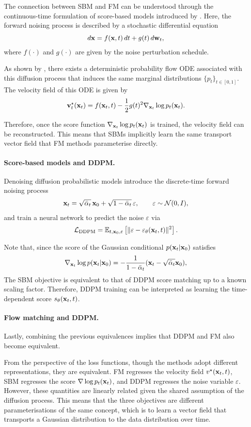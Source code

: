 The connection between SBM and FM can be understood through the continuous-time formulation of score-based models introduced by \cite{song2021scorebased}. Here, the forward noising process is described by a stochastic differential equation
\[
d{ \mathbf{x}} = f({ \mathbf{x}},t)\,dt + g(t)\,d{ \mathbf{w}}_t,
\]
where $f(\cdot)$ and $g(\cdot)$ are given by the noise perturbation schedule. 

As shown by \cite{song2021scorebased}, there exists a deterministic probability flow ODE associated with this diffusion process that induces the same marginal distributions $\{p_t\}_{t\in[0,1]}$. The velocity field of this ODE is given by
\[
{ \mathbf{v}}_t^\star({ \mathbf{x}}_t)
=
f({ \mathbf{x}}_t,t)
-
\frac{1}{2} g(t)^2 \nabla_{{ \mathbf{x}}_t}\log p_t({ \mathbf{x}}_t).
\]

Therefore, once the score function $\nabla_{{ \mathbf{x}}_t}\log p_t({ \mathbf{x}}_t)$ is trained, the velocity field can be reconstructed. This means that SBMs implicitly learn the same transport vector field that FM methods parameterise directly.

\paragraph{Score-based models and DDPM.}

Denoising diffusion probabilistic models introduce the discrete-time forward noising process
\[
{ \mathbf{x}}_t = \sqrt{\bar{\alpha}_t}\,{ \mathbf{x}}_0 + \sqrt{1-\bar{\alpha}_t}\,\varepsilon,
\qquad \varepsilon \sim \mathcal{N}(0,I),
\]
and train a neural network to predict the noise $\varepsilon$ via
\[
\mathcal{L}_{\text{DDPM}}
=
\mathbb{E}_{t,{ \mathbf{x}}_0,\varepsilon}
\left[
\|\varepsilon - \varepsilon_\theta({ \mathbf{x}}_t,t)\|^2
\right].
\]


Note that, since  the score of the Gaussian conditional $p({ \mathbf{x}}_t|{ \mathbf{x}}_0)$ satisfies
\[
\nabla_{{ \mathbf{x}}_t}\log p({ \mathbf{x}}_t|{ \mathbf{x}}_0)
=
-\frac{1}{1-\bar{\alpha}_t}
({ \mathbf{x}}_t - \sqrt{\bar{\alpha}_t}{ \mathbf{x}}_0),
\]
The SBM objective is equivalent to that of DDPM score matching up to a known scaling factor. Therefore, DDPM training can be interpreted as learning the time-dependent score $s_\theta({ \mathbf{x}}_t,t)$.

\paragraph{Flow matching and DDPM.}

Lastly, combining the previous equivalences implies that DDPM and FM also become equivalent.

From the perspective of the loss functions, though the methods adopt different representations, they are equivalent. FM regresses the velocity field $v^\star({ \mathbf{x}}_t,t)$, SBM regresses the score $\nabla\log p_t({ \mathbf{x}}_t)$, and DDPM regresses the noise variable $\varepsilon$. However, these quantities are linearly related given the shared assumption of the diffusion process. This means that  the three objectives are different parameterisations of the same concept, which is to learn a vector field that transports a Gaussian distribution to the data distribution over time.